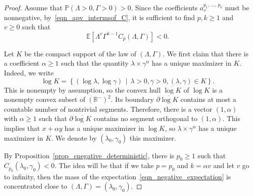 \documentclass[10pt]{amsart}
\theoremstyle{definition}\newtheorem{defi}[theo]{Definition}\newtheorem{rema}[theo]{Remark}\newtheorem{exam}[theo]{Example}\newtheorem{exem}[theo]{Example}\newtheorem{nota}[theo]{Notation}
\newcommand{\R}{\mathbb{R}}
\newcommand{\E}{\mathbb{E}}
\renewcommand{\P}{\mathbb{P}}
\begin{document}
\begin{proof}
Assume that $\P (\Lambda > 0, \Gamma > 0 )>0$. Since the coefficients $a_v^{p_1,\,\dots,\,p_k}$ must be nonnegative, by~\eqref{eqn_apv_intermsof_C}, it is sufficient to find $p,k \geq 1$ and $v \geq 0$ such that
\begin{equation}\label{eqn_negative_expectation}
\E \left[\Lambda^v \Gamma^{k-1} C_p(\Lambda, \Gamma) \right] <0.
\end{equation}

Let $K$ be the compact support of the law of $(\Lambda, \Gamma)$. We first claim that there is a coefficient $\alpha \geq 1$ such that the quantity $\lambda \times \gamma^{\alpha}$ has a unique maximizer in $K$. Indeed, we write
\[
\log K = \left\{ \left(\log \lambda, \log \gamma \right)\, \middle|\, \lambda>0, \gamma>0, (\lambda, \gamma) \in K \right\}.
\]
This is nonempty by assumption, so the convex hull $\overline{\log K}$ of $\log K$ is a nonempty convex subset of $\left(\R^- \right)^2$. Its boundary $\partial \overline{\log K}$ contains at most a countable number of nontrivial segments. Therefore, there is a vector $(1,\alpha)$ with $\alpha \geq 1$ such that $\partial \overline{\log K}$ contains no segment orthogonal to $(1,\alpha)$. This implies that $x+\alpha y$ has a unique maximizer in $\log K$, so $\lambda \times \gamma^{\alpha}$ has a unique maximizer in $K$. We denote by $(\lambda_0,\gamma_0)$ this maximizer.

By Proposition~\ref{prop_cnegative_deterministic}, there is $p_0 \geq 1$ such that $C_{p_0} (\lambda_0, \gamma_0) <0$. The idea will be that if we take $p=p_0$ and $k=\alpha v$ and let $v$ go to infinity, then the mass of the expectation~\eqref{eqn_negative_expectation} is concentrated close to $(\Lambda, \Gamma)=(\lambda_0,\gamma_0)$.


\end{proof}
\end{document}
